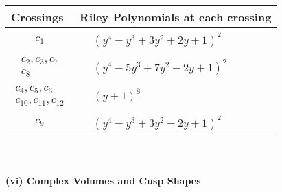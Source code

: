 \documentclass[1p]{elsarticle_modified}
\theoremstyle{definition}
\begin{document}
\begin{tabular}{m{50pt}|m{274pt}}
Crossings & \hspace{64pt}Riley Polynomials at each crossing \\
\hline $$\begin{aligned}c_{1}\end{aligned}$$&$\begin{aligned}
&(y^4+y^3+3 y^2+2 y+1)^2
\end{aligned}$\\
\hline $$\begin{aligned}c_{2},c_{3},c_{7}\\c_{8}\end{aligned}$$&$\begin{aligned}
&(y^4-5 y^3+7 y^2-2 y+1)^2
\end{aligned}$\\
\hline $$\begin{aligned}c_{4},c_{5},c_{6}\\c_{10},c_{11},c_{12}\end{aligned}$$&$\begin{aligned}
&(y+1)^8
\end{aligned}$\\
\hline $$\begin{aligned}c_{9}\end{aligned}$$&$\begin{aligned}
&(y^4- y^3+3 y^2-2 y+1)^2
\end{aligned}$\\
\hline
\end{tabular}\\~\\
\newpage\flushleft \textbf{(vi) Complex Volumes and Cusp Shapes}
\end{document}
